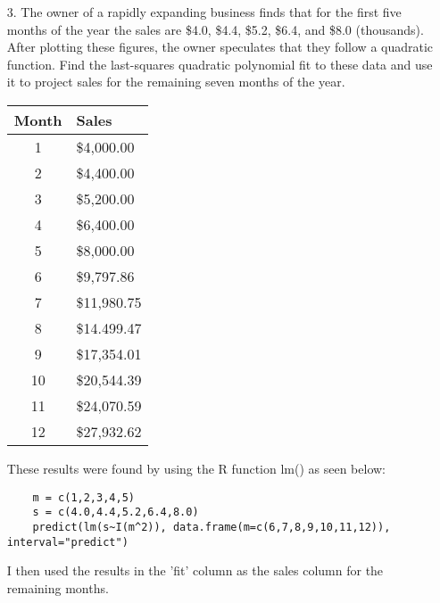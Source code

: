 \documentclass[12pt]{article}
\theoremstyle{definition}
\theoremstyle{plain}
\begin{document}
\begin{enumerate}
\item[3.]The owner of a rapidly expanding business finds that for the first five months of the year the sales are \$4.0, \$4.4, \$5.2, \$6.4, and \$8.0 (thousands). After plotting these figures, the owner speculates that they follow a quadratic function. Find the last-squares quadratic polynomial fit to these data and use it to project sales for the remaining seven months of the year.
	\begin{center}
	\begin{tabular}{c|l}
	Month&Sales\\
	\hline
	1&\$4,000.00\\
	2&\$4,400.00\\
	3&\$5,200.00\\
	4&\$6,400.00\\
	5&\$8,000.00\\
	6&\$9,797.86\\
	7&\$11,980.75\\
	8&\$14.499.47\\
	9&\$17,354.01\\
	10&\$20,544.39\\
	11&\$24,070.59\\
	12&\$27,932.62\\
	\end{tabular}
	\end{center}
	These results were found by using the R function lm() as seen below:
	\begin{verbatim}
	m = c(1,2,3,4,5)
	s = c(4.0,4.4,5.2,6.4,8.0)
	predict(lm(s~I(m^2)), data.frame(m=c(6,7,8,9,10,11,12)), interval="predict")
	\end{verbatim}
	I then used the results in the 'fit' column as the sales column for the remaining months.


\end{enumerate}
\end{document}
